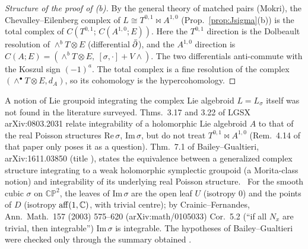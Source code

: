 \begin{proof}[Structure of the proof of (b)]
By the general theory of matched pairs (Mokri), the Chevalley--Eilenberg complex of $L\cong T^{0,1}\bowtie A^{1,0}$ (Prop.~\ref{prop:Jsigma}(b)) is the total complex of $C(T^{0,1};\,C(A^{1,0};E))$. Here the $T^{0,1}$ direction is the Dolbeault resolution of $\wedge^bT\otimes E$ (differential $\bar\partial$), and the $A^{1,0}$ direction is $C(A;E)=(\wedge^bT\otimes E,\ [\sigma,\cdot]+V\wedge)$. The two differentials anti-commute with the Koszul sign $(-1)^a$. The total complex is a fine resolution of the complex $(\wedge^\bullet T\otimes E,d_A)$, so its cohomology is the hypercohomology.\qedhere
\end{proof}

\begin{rem}
A notion of Lie groupoid integrating the complex Lie algebroid $L=L_\sigma$ itself was not found in the literature surveyed. Thms.~3.17 and 3.22 of LGSX arXiv:0803.2031 relate integrability of a holomorphic Lie algebroid $A$ to that of the real Poisson structures $\mathrm{Re}\,\sigma$, $\mathrm{Im}\,\sigma$, but do not treat $T^{0,1}\bowtie A^{1,0}$ (Rem.~4.14 of that paper only poses it as a question). Thm.~7.1 of Bailey--Gualtieri, arXiv:1611.03850 (title \tQ), states the equivalence between a generalized complex structure integrating to a weak holomorphic symplectic groupoid (a Morita-class notion) and integrability of its underlying real Poisson structure. \tP\ For the smooth cubic $\sigma$ on $\mathbb{CP}^2$, the leaves of $\mathrm{Im}\,\sigma$ are the open leaf $U$ (isotropy $0$) and the points of $D$ (isotropy $\mathrm{aff}(1,\mathbb C)$, with trivial centre); by Crainic--Fernandes, Ann.\ Math.\ 157 (2003) 575--620 (arXiv:math/0105033) Cor.~5.2 (``if all $N_x$ are trivial, then integrable'') $\mathrm{Im}\,\sigma$ is integrable. The hypotheses of Bailey--Gualtieri were checked only through the summary obtained \tQ.
\end{rem}

